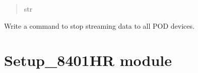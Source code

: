 \documentclass[letterpaper,10pt,english]{sphinxmanual}
\begin{document}
\begin{fulllineitems}
\begin{fulllineitems}
\begin{quote}
\begin{description}
\sphinxAtStartPar
str

\end{description}\end{quote}

\end{fulllineitems}


\begin{fulllineitems}
\label{\detokenize{Setup_8206HR:Setup_8206HR.Setup_8206HR.StopStream}}
\pysigstartsignatures
{}
\pysigstopsignatures
\sphinxAtStartPar
Write a command to stop streaming data to all POD devices.

\end{fulllineitems}


\end{fulllineitems}


\sphinxstepscope


\section{Setup\_8401HR module}
\label{\detokenize{Setup_8401HR:module-Setup_8401HR}}\label{\detokenize{Setup_8401HR:setup-8401hr-module}}\label{\detokenize{Setup_8401HR::doc}}
\end{document}
